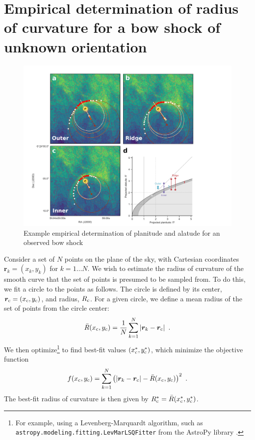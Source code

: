 \section{Empirical determination of radius of curvature for a bow shock of unknown orientation}
\label{app:rcurv-empirical}


\begin{figure}
  \centering
  \includegraphics[width=\linewidth]{figs/new-000-400-multi-fig}
  \caption{Example empirical determination of planitude and alatude
    for an observed bow shock}
  \label{fig:000-400-fit}
\end{figure}

Consider a set of \(N\) points on the plane of the sky, with Cartesian
coordinates \(\bm{r}_k = (x_k, y_k)\) for \(k = 1 \dots N\).  We wish
to estimate the radius of curvature of the smooth curve that the set
of points is presumed to be sampled from.  To do this, we fit a circle
to the points as follows.  The circle is defined by its center,
\(\bm{r}_{\mathrm{c}} = (x_{\mathrm{c}}, y_{\mathrm{c}})\), and radius, \(R_{\mathrm{c}}\).  For a
given circle, we define a mean radius of the set of points from the
circle center:
\begin{equation}
  \label{eq:rcurv-mean-radius}
  \bar{R}(x_{\mathrm{c}}, y_{\mathrm{c}}) = \frac{1}{N}  \sum_{k = 1}^{N} \left\lvert\bm{r}_k - \bm{r}_{\mathrm{c}}\right\rvert  \ .
\end{equation}
We then optimize\footnote{%
  For example, using a Levenberg-Marquardt algorithm, such as
  \texttt{astropy.modeling.fitting.LevMarLSQFitter} from the AstroPy
  library \citep{Astropy-Collaboration:2013a}.} %
to find best-fit values \((x_{\mathrm{c}}^*, y_{\mathrm{c}}^*)\), which minimize the
objective function
\begin{equation}
  \label{eq:rcurv-objective-function}
  f(x_{\C}, y_{\C}) = \sum_{k = 1}^{N} \left(
    \abs{\bm{r}_k - \bm{r}_{\C}}  - \bar{R} (x_{\C}, y_{\C}) \right)^2 \ .
\end{equation}
The best-fit radius of curvature is then given by
\(R_{\mathrm{c}}^* = \bar{R}(x_{\mathrm{c}}^*, y_{\mathrm{c}}^*)\).

